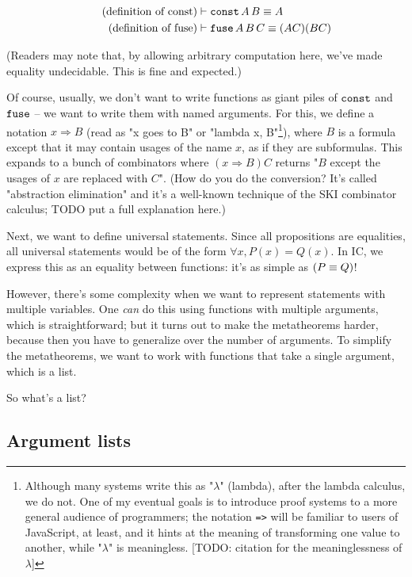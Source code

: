 \documentclass{article}
\begin{document}
  \begin{align*}
    \tag{definition of const}\label{def_const}
    &\vdash \operatorname{\texttt{const}} A\, B \equiv A \\
    \tag{definition of fuse}\label{def_fuse}
    &\vdash \operatorname{\texttt{fuse}} A\, B\, C \equiv (AC)(BC)
  \end{align*}
  
  (Readers may note that, by allowing arbitrary computation here, we've made equality undecidable. This is fine and expected.)

  \newcommand{\nameabst}[1]{#1 \Rightarrow}

  Of course, usually, we don't want to write functions as giant piles of $\operatorname{\texttt{const}}$ and $\operatorname{\texttt{fuse}}$ – we want to write them with named arguments. For this, we define a notation $\nameabst{x} B$ (read as "x goes to B" or "lambda x, B"\footnote{Although many systems write this as "$\lambda$" (lambda), after the lambda calculus, we do not. One of my eventual goals is to introduce proof systems to a more general audience of programmers; the notation \texttt{=>} will be familiar to users of JavaScript, at least, and it hints at the meaning of transforming one value to another, while "$\lambda$" is meaningless. [TODO: citation for the meaninglessness of $\lambda$]}), where $B$ is a formula except that it may contain usages of the name $x$, as if they are subformulas. This expands to a bunch of combinators where $(\nameabst{x} B) C$ returns "$B$ except the usages of $x$ are replaced with $C$". (How do you do the conversion? It's called "abstraction elimination" and it's a well-known technique of the SKI combinator calculus; TODO put a full explanation here.)
  
  Next, we want to define universal statements. Since all propositions are equalities, all universal statements would be of the form $\forall x, P(x) = Q(x)$. In IC, we express this as an equality between functions: it's as simple as $(P \equiv Q)$!
  
  However, there's some complexity when we want to represent statements with multiple variables. One \emph{can} do this using functions with multiple arguments, which is straightforward; but it turns out to make the metatheorems harder, because then you have to generalize over the number of arguments. To simplify the metatheorems, we want to work with functions that take a single argument, which is a list.
  
  So what's a list?
  
  \subsection{Argument lists}
  
\end{document}
